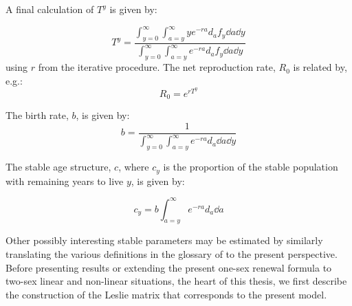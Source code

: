  \FloatBarrier
 \label{sec:ex1sexother}
A final calculation of $T^y$ is given by:

\begin{equation}
\label{eq:Ty}
 T^y =  \frac{\int _{y=0}^\infty \int _{a=y}^\infty y e^{-ra} d_a f_y \dd a
\dd y}{\int _{y=0}^\infty \int _{a=y}^\infty e^{-ra} d_a f_y \dd a \dd y}
\end{equation}
using $r$ from the iterative procedure. The net reproduction rate, $R_0$ is
related by, e.g.:
\begin{equation}
\label{eq:R0fromTy}
R_0 = e^{r T^y}
\end{equation}

The birth rate, $b$, is given by:
\begin{equation}
\label{eq:eybrate}
b = \frac{1}{\int _{y=0}^\infty \int _{a=y}^\infty e^{-ra} d_a \dd a
\dd y}
\end{equation}

The stable age structure, $c$, where $c_y$ is the
proportion of the stable population with remaining years to live $y$, is given
by:

\begin{equation}
\label{eq:cy}
c_y = b \int _{a=y}^\infty e^{-ra} d_a \dd a
\end{equation}

Other possibly interesting stable parameters may be estimated by
similarly translating the various definitions in the glossary of
\citet{coale1972growth} to the present perspective. Before presenting 
results or extending the present one-sex renewal
formula to two-sex linear and non-linear situations, the heart of this 
thesis, we first describe the construction of the Leslie matrix that corresponds to the
present model.